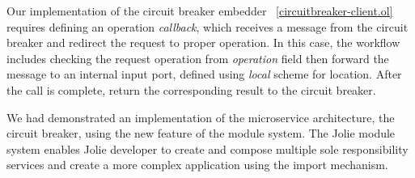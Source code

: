 Our implementation of the circuit breaker embedder ~\ref{circuitbreaker-client.ol} requires defining an operation \textit{callback}, which receives a message from the circuit breaker and redirect the request to proper operation. In this case, the workflow includes checking the request operation from \textit{operation} field then forward the message to an internal input port, defined using \textit{local} scheme for location. After the call is complete, return the corresponding result to the circuit breaker.

We had demonstrated an implementation of the microservice architecture, the circuit breaker, using the new feature of the module system. The Jolie module system enables Jolie developer to create and compose multiple sole responsibility services and create a more complex application using the import mechanism.